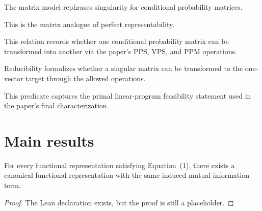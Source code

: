 \begin{definition}
\label{def:matrix-singular}
The matrix model rephrases singularity for conditional probability matrices.
\end{definition}

\begin{definition}
\label{def:matrix-perfect}
This is the matrix analogue of perfect representability.
\end{definition}

\begin{definition}
\label{def:reachability}
This relation records whether one conditional probability matrix can be transformed into another via the paper's PPS, VPS, and PPM operations.
\end{definition}

\begin{definition}
\label{def:reducible}
Reducibility formalizes whether a singular matrix can be transformed to the one-vector target through the allowed operations.
\end{definition}

\begin{definition}
\label{def:lp-criterion}
This predicate captures the primal linear-program feasibility statement used in the paper's final characterization.
\end{definition}

\section{Main results}

\begin{lemma}
\label{lem:canonical}
For every functional representation satisfying Equation~(1), there exists a canonical functional representation with the same induced mutual information term.
\end{lemma}

\begin{proof}
\notready
{}
The Lean declaration exists, but the proof is still a placeholder.
\end{proof}

